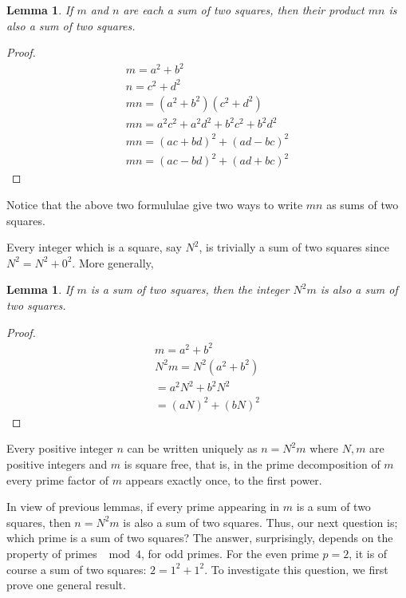 \documentclass[12pt]{article}
\newtheorem{lem}[thm]{Lemma}
\begin{document}
\begin{lem} If $m$ and $n$ are each a sum of two squares, then their product $mn$ is also a sum of two squares. 
\end{lem}
\begin{proof}
    \begin{gather}
        m = a^2 + b^2\\
        n = c^2 + d^2\\
        mn = (a^2 + b^2)(c^2 + d^2)\\
        mn = a^2 c^2 + a^2 d^2 + b^2 c^2 + b^2 d^2\\
        mn = (ac + bd)^2 + (ad - bc)^2\\
        mn = (ac - bd)^2 + (ad + bc)^2
    \end{gather} 
\end{proof}

Notice that the above two formululae give two ways to write $mn$ as sums of two squares.

Every integer which is a square, say $N^2$, is trivially a sum of two squares since $N^2=N^2+0^2$. More generally, 

\begin{lem} If $m$ is a sum of two squares, then the integer $N^2m$ is also a sum of two squares. 
\end{lem}
\begin{proof}
    \begin{gather}
        m = a^2 + b^2\\
        N^2 m = N^2 ( a^2 + b^2 )\\
        = a^2 N^2 + b^2 N^2\\
        = (aN)^2 + (bN)^2
    \end{gather}
\end{proof}

Every positive integer $n$ can be written uniquely as $n=N^2m$ where $N,m$ are positive integers and $m$ is square free, that is, in the prime decomposition of $m$ every prime factor of $m$ appears exactly once, to the first power. 

In view of previous lemmas, if every prime appearing in $m$ is a sum of two squares, then $n=N^2m$ is also a sum of two squares. Thus, our next question is; which prime is a sum of two squares? The answer, surprisingly, depends on the property of primes $\mod 4$, for odd primes. For the even prime $p=2$, it is of course a sum of two squares: $2=1^2+1^2$. To investigate this question, we first prove one general result.
\end{document}
